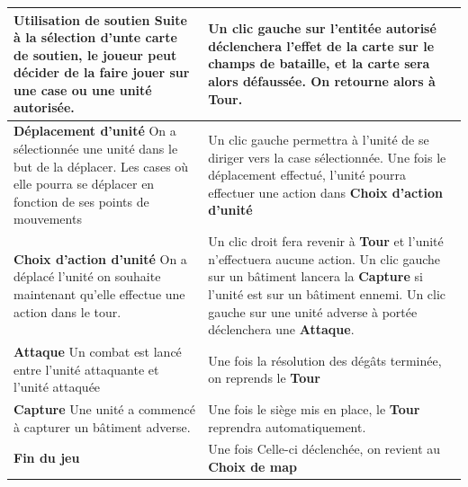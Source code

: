 \begin{tabularx}{15 cm}{|X|X|}

\hline

\textbf{Utilisation de soutien} \newline Suite à la sélection d'unte carte de soutien, le joueur peut décider de la faire jouer sur une case ou une unité autorisée. & Un clic gauche sur l'entitée autorisé déclenchera l'effet de la carte sur le champs de bataille, et la carte sera alors défaussée. On retourne alors à \textbf{Tour}. \\

\hline
\textbf{Déplacement d'unité} \newline On a sélectionnée une unité dans le but de la déplacer. Les cases où elle pourra se déplacer en fonction de ses points de mouvements & Un clic gauche permettra à l'unité de se diriger vers la case sélectionnée. Une fois le déplacement effectué, l'unité pourra effectuer une action dans \textbf{Choix d'action d'unité} \\

\hline
\textbf{Choix d'action d'unité} \newline On a déplacé l'unité on souhaite maintenant qu'elle effectue une action dans le tour. & Un clic droit fera revenir à \textbf{Tour} et l'unité n'effectuera aucune action. Un clic gauche sur un bâtiment lancera la \textbf{Capture} si l'unité est sur un bâtiment ennemi. Un clic gauche sur une unité adverse à portée déclenchera une \textbf{Attaque}.\\

\hline
\textbf{Attaque} \newline Un combat est lancé entre l'unité attaquante et l'unité attaquée & Une fois la résolution des dégâts terminée, on reprends le \textbf{Tour} \\


\hline
\textbf{Capture} \newline Une unité a commencé à capturer un bâtiment adverse. & Une fois le siège mis en place, le \textbf{Tour} reprendra automatiquement. \\

\hline
\textbf{Fin du jeu} & Une fois Celle-ci déclenchée, on revient au \textbf{Choix de map}  \\

\hline

\end{tabularx}








